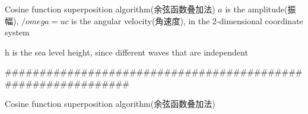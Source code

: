 \documentclass{beamer}
\begin{document}
\begin{frame}{Cosine function superposition algorithm(余弦函数叠加法)}
  $a$ is the amplitude(振幅), $/omega = uc$ is the angular velocity(角速度), in the 2-dimensional coordinate system
  \begin{figure}[thpb]
    \centering
  \label{fig:system}
  \end{figure}
  h is the sea level height, since different waves that are independent
  \begin{figure}[thpb]
    \centering
  \label{fig:system}
  \end{figure}
\end{frame}
#############################################################

\begin{frame}{Cosine function superposition algorithm(余弦函数叠加法)}
  \begin{figure}[thpb]
    \centering
  \label{fig:system}
  \end{figure}
\end{frame}
  
\end{document}

